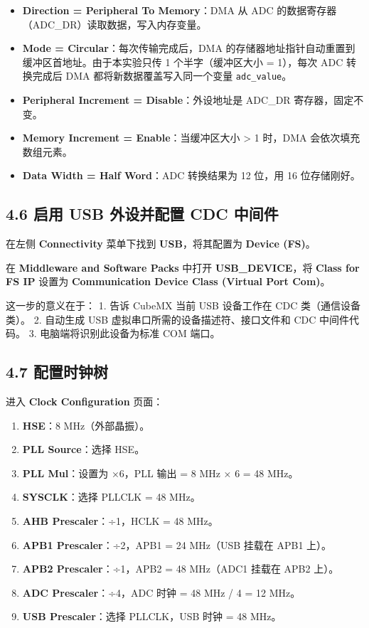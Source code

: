\documentclass[
  chinese,
  UTF8,
  oneside,
  openany]{ctexbook}
\providecommand{\tightlist}{%
  \setlength{\itemsep}{0pt}\setlength{\parskip}{0pt}}
\begin{document}
\begin{itemize}
\tightlist
\item
  \textbf{Direction = Peripheral To Memory}：DMA 从 ADC
  的数据寄存器（ADC\_DR）读取数据，写入内存变量。
\item
  \textbf{Mode = Circular}：每次传输完成后，DMA
  的存储器地址指针自动重置到缓冲区首地址。由于本实验只传 1
  个半字（缓冲区大小 = 1），每次 ADC 转换完成后 DMA
  都将新数据覆盖写入同一个变量 \texttt{adc\_value}。
\item
  \textbf{Peripheral Increment = Disable}：外设地址是 ADC\_DR
  寄存器，固定不变。
\item
  \textbf{Memory Increment = Enable}：当缓冲区大小 \textgreater{} 1
  时，DMA 会依次填充数组元素。
\item
  \textbf{Data Width = Half Word}：ADC 转换结果为 12 位，用 16
  位存储刚好。
\end{itemize}

\subsection{4.6 启用 USB 外设并配置 CDC
中间件}\label{ux542fux7528-usb-ux5916ux8bbeux5e76ux914dux7f6e-cdc-ux4e2dux95f4ux4ef6}

在左侧 \textbf{Connectivity} 菜单下找到 \textbf{USB}，将其配置为
\textbf{Device (FS)}。

在 \textbf{Middleware and Software Packs} 中打开
\textbf{USB\_DEVICE}，将 \textbf{Class for FS IP} 设置为
\textbf{Communication Device Class (Virtual Port Com)}。

这一步的意义在于： 1. 告诉 CubeMX 当前 USB 设备工作在 CDC
类（通信设备类）。 2. 自动生成 USB 虚拟串口所需的设备描述符、接口文件和
CDC 中间件代码。 3. 电脑端将识别此设备为标准 COM 端口。

\subsection{4.7 配置时钟树}\label{ux914dux7f6eux65f6ux949fux6811-1}

进入 \textbf{Clock Configuration} 页面：

\begin{enumerate}
\def\labelenumi{\arabic{enumi}.}
\tightlist
\item
  \textbf{HSE}：8 MHz（外部晶振）。
\item
  \textbf{PLL Source}：选择 HSE。
\item
  \textbf{PLL Mul}：设置为 ×6，PLL 输出 = 8 MHz × 6 = 48 MHz。
\item
  \textbf{SYSCLK}：选择 PLLCLK = 48 MHz。
\item
  \textbf{AHB Prescaler}：÷1，HCLK = 48 MHz。
\item
  \textbf{APB1 Prescaler}：÷2，APB1 = 24 MHz（USB 挂载在 APB1 上）。
\item
  \textbf{APB2 Prescaler}：÷1，APB2 = 48 MHz（ADC1 挂载在 APB2 上）。
\item
  \textbf{ADC Prescaler}：÷4，ADC 时钟 = 48 MHz / 4 = 12 MHz。
\item
  \textbf{USB Prescaler}：选择 PLLCLK，USB 时钟 = 48 MHz。
\end{enumerate}
\end{document}
